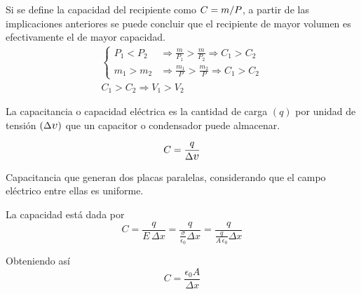 Si se define la capacidad del recipiente como $C= m/P$, a partir de las implicaciones anteriores se puede concluir que el recipiente de mayor volumen es efectivamente el de mayor capacidad.
\begin{gather*}
    \left\{
    \begin{aligned}
        P_1 < P_2 & \Rightarrow \frac{m}{P_1} > \frac{m}{P_2} \Rightarrow C_1 > C_2
        \\[1ex]
        m_1 > m_2 & \Rightarrow \frac{m_1}{P} > \frac{m_2}{P} \Rightarrow C_1 > C_2
    \end{aligned}
    \right.
    \\[1em]
    C_1 > C_2 \Rightarrow V_1 > V_2
\end{gather*}

La capacitancia o capacidad eléctrica es la cantidad de carga $(q)$ por unidad de tensión $(\Delta \voltage)$ que un capacitor o condensador puede almacenar.

\begin{mdframed}[style=DefinitionFrame]
    \begin{defn}
    \end{defn}
    \begin{equation*}
        C = \frac{q}{\Delta \voltage}
    \end{equation*}
\end{mdframed}

\begin{mdframed}[style=ExampleFrame]
    \begin{example}
    \end{example}
    \begin{formatI}
        Capacitancia que generan dos placas paralelas, considerando que el campo eléctrico entre ellas es uniforme.
    \end{formatI}
    La capacidad está dada por
    \begin{equation*}
        C = \frac{q}{E \, \Delta x} = \frac{q}{\frac{\sigma}{\epsilon_0}\Delta x} = \frac{q}{\tfrac{q}{A \, \epsilon_0}\Delta x}
    \end{equation*}

    Obteniendo así
    \begin{equation*}
        C = \frac{\epsilon_0 A}{\Delta x}
    \end{equation*}
\end{mdframed}

